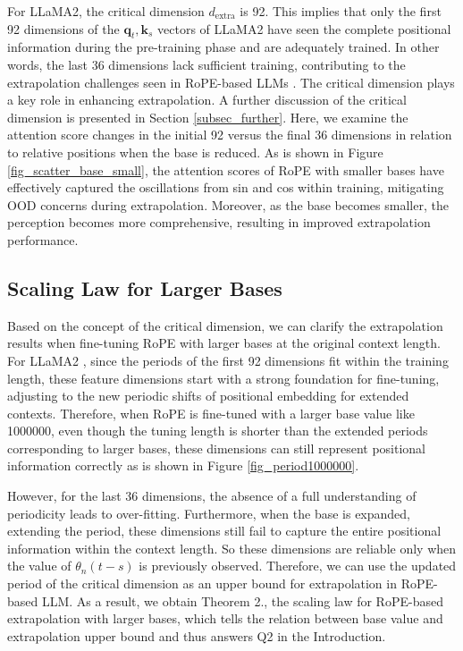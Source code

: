 For LLaMA2\citep{touvron2023llama2}, the critical dimension $d_\text{extra}$ is 92. This implies that only the first 92 dimensions of the $\bm{q}_t,\bm{k}_s$ vectors of LLaMA2 have seen the complete positional information during the pre-training phase and are adequately trained. In other words, the last 36 dimensions lack sufficient training, contributing to the extrapolation challenges seen in RoPE-based LLMs \citep{chen2023extending,han2023lm}. The critical dimension plays a key role in enhancing extrapolation. A further discussion of the critical dimension is presented in Section \ref{subsec_further}. Here, we examine the attention score changes in the initial 92 versus the final 36 dimensions in relation to relative positions when the base is reduced. As is shown in Figure \ref{fig_scatter_base_small}, the attention scores of RoPE with smaller bases have effectively captured the oscillations from sin and cos within training, mitigating OOD concerns during extrapolation. Moreover, as the base becomes smaller, the perception becomes more comprehensive, resulting in improved extrapolation performance.

\subsection{Scaling Law for Larger Bases}\label{subsec_large}

Based on the concept of the critical dimension, we can clarify the extrapolation results when fine-tuning RoPE with larger bases at the original context length. For LLaMA2 \citep{touvron2023llama2}, since the periods of the first 92 dimensions fit within the training length, these feature dimensions start with a strong foundation for fine-tuning, adjusting to the new periodic shifts of positional embedding for extended contexts. Therefore, when RoPE is fine-tuned with a larger base value like 1000000, even though the tuning length is shorter than the extended periods corresponding to larger bases, these dimensions can still represent positional information correctly as is shown in Figure \ref{fig_period1000000}.

However, for the last 36 dimensions, the absence of a full understanding of periodicity leads to over-fitting. Furthermore, when the base is expanded, extending the period, these dimensions still fail to capture the entire positional information within the context length. So these dimensions are reliable only when the value of $\theta_n(t-s)$ is previously observed. Therefore, we can use the updated period of the critical dimension as an upper bound for extrapolation in RoPE-based LLM. As a result, we obtain Theorem 2., the scaling law for RoPE-based extrapolation with larger bases, which tells the relation between base value and extrapolation upper bound and thus answers Q2 in the Introduction.

